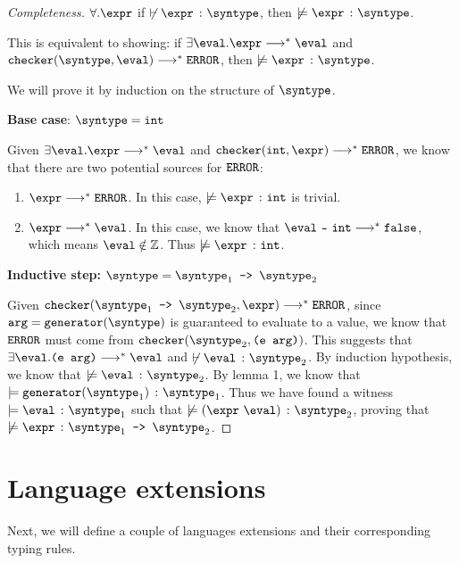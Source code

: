 \begin{proof}[Completeness]
  $\forall. \expr$ if $\not\vdash \hastype{\expr}{\syntype}$, then $\not\models \hastype{\expr}{\syntype}$.

  This is equivalent to showing: if $\exists \eval. \expr \smallsteps[] \eval$ and $\mkche{\syntype}{\eval} \smallsteps[] \eerror$, then $\not\models \hastype{\expr}{\syntype}$.

  We will prove it by induction on the structure of $\syntype$.

  \textbf{Base case}: $\syntype = \tint$

  Given $\exists \eval. \expr \smallsteps[] \eval$ and $\mkche{\tint}{\expr} \smallsteps[] \eerror$, we know that there are two potential sources for $\texttt{ERROR}$:
  \begin{enumerate}
    \item $\expr \smallsteps[] \eerror$. In this case, $\not\models \hastype{\expr}{\tint}$ is trivial. 
    \item $\expr \smallsteps[] \eval$. In this case, we know that $\matches{\eval}{\tint} \smallsteps[] \texttt{false}$, which means $\eval \notin \mathbb{Z}$. Thus $\not\models \hastype{\expr}{\tint}$. 
  \end{enumerate}

  \textbf{Inductive step:} $\syntype = \mkfun{\syntype_1}{\syntype_2}$

  Given $\mkche{\mkfun{\syntype_1}{\syntype_2}}{\expr} \smallsteps[] \eerror$, since $\texttt{arg} = \mkgen{\syntype}$ is guaranteed to evaluate to a value, we know that $\texttt{ERROR}$ must come from $\mkche{\syntype_2}{\texttt{(e arg)}}$. This suggests that $\exists \eval. \texttt{(e arg)} \smallsteps[] \eval$ and $\not\vdash \hastype{\eval}{\syntype_2}$. By induction hypothesis, we know that $\not\models \hastype{\texttt{\eval}}{\syntype_2}$. By lemma 1, we know that $\models \hastype{\mkgen{\syntype_1}}{\syntype_1}$. Thus we have found a witness $\models \hastype{\eval}{\syntype_1}$ such that $\not\models \hastype{(\expr \ \eval)}{\syntype_2}$, proving that $\not\models \hastype{\expr}{\mkfun{\syntype_1}{\syntype_2}}$.


\end{proof}

\section{Language extensions}

Next, we will define a couple of languages extensions and their corresponding typing rules.

